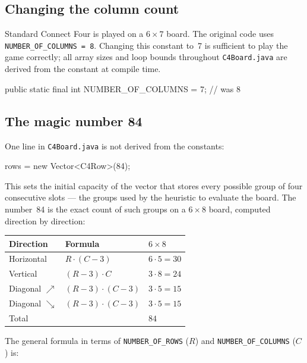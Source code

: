 \documentclass[language=english,titlepage=false,smartquotes=true]{hgbreport}
\begin{document}
\subsection{Changing the column count}

Standard Connect Four is played on a $6 \times 7$ board. The original code
uses \texttt{NUMBER\_OF\_COLUMNS = 8}. Changing this constant to~7 is
sufficient to play the game correctly; all array sizes and loop bounds
throughout \texttt{C4Board.java} are derived from the constant at compile time.

\begin{JavaCode}[numbers=none]
public static final int NUMBER_OF_COLUMNS = 7; // was 8
\end{JavaCode}

\subsection{The magic number 84}

One line in \texttt{C4Board.java} is not derived from the constants:

\begin{JavaCode}[numbers=none]
rows = new Vector<C4Row>(84);
\end{JavaCode}

This sets the initial capacity of the vector that stores every possible
group of four consecutive slots --- the groups used by the heuristic to
evaluate the board. The number~84 is the exact count of such groups on
a $6 \times 8$ board, computed direction by direction:

\begin{center}
\begin{tabular}{lll}
  \hline
  Direction & Formula & $6 \times 8$ \\
  \hline
  Horizontal          & $R \cdot (C-3)$         & $6 \cdot 5 = 30$ \\
  Vertical            & $(R-3) \cdot C$         & $3 \cdot 8 = 24$ \\
  Diagonal $\nearrow$ & $(R-3) \cdot (C-3)$     & $3 \cdot 5 = 15$ \\
  Diagonal $\searrow$ & $(R-3) \cdot (C-3)$     & $3 \cdot 5 = 15$ \\
  \hline
  Total               &                         & $84$ \\
  \hline
\end{tabular}
\end{center}

The general formula in terms of \texttt{NUMBER\_OF\_ROWS} ($R$) and
\texttt{NUMBER\_OF\_COLUMNS} ($C$) is:
\end{document}
